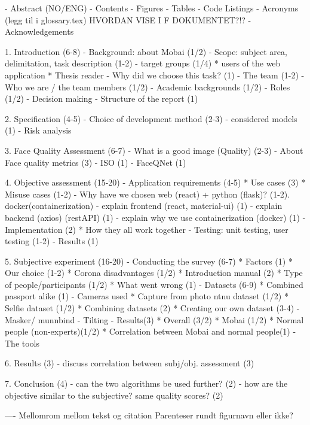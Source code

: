 - Abstract (NO/ENG)
- Contents
- Figures
- Tables
- Code Listings
- Acronyms (legg til i glossary.tex) HVORDAN VISE I F DOKUMENTET?!?
- Acknowledgements

1. Introduction (6-8)
 - Background: about Mobai (1/2)
 - Scope: subject area, delimitation, task description (1-2)
 - target groups (1/4)
    * users of the web application
    * Thesis reader
 - Why did we choose this task? (1)
 - The team (1-2)
   - Who we are / the team members (1/2)
   - Academic backgrounds (1/2)
   - Roles (1/2)
   - Decision making
 - Structure of the report (1)
 
 2. Specification (4-5)
    - Choice of development method (2-3) 
        - considered models (1)
    - Risk analysis
    
    
3. Face Quality Assessment (6-7)
    - What is a good image (Quality) (2-3)
    - About Face quality metrics (3)
        - ISO (1)
        - FaceQNet (1)
  
  
4. Objective assessment (15-20)
    - Application requirements (4-5)
        * Use cases (3)
        * Misuse cases (1-2)
    - Why have we chosen web (react) + python (flask)? (1-2). docker(containerization) 
    - explain frontend (react, material-ui) (1)
    - explain backend (axios) (restAPI) (1)
    - explain why we use containerization (docker) (1)
    - Implementation (2)
        * How they all work together
    - Testing: unit testing, user testing (1-2)
    - Results (1)
    

5. Subjective experiment (16-20)
   - Conducting the survey  (6-7)
        * Factors (1) 
        * Our choice (1-2) 
        * Corona disadvantages (1/2)
        * Introduction manual (2) 
        * Type of people/participants (1/2)
        * What went wrong (1)
    - Datasets (6-9)
        * Combined passport alike (1)
            - Cameras used
        * Capture from photo ntnu dataset (1/2)
        * Selfie dataset (1/2)
        * Combining datasets (2)
        * Creating our own dataset (3-4)
            - Masker/ munnbind 
            - Tilting 
    - Results(3) 
        * Overall (3/2)
        * Mobai (1/2)
        * Normal people (non-experts)(1/2)
        * Correlation between Mobai and normal people(1)
            - The tools
 
6. Results (3)
     - discuss correlation between subj/obj. assessment (3)
  
7. Conclusion (4)
    - can the two algorithms be used further? (2)
    - how are the objective similar to the subjective? same quality scores? (2)
  
 
 
 ----
 Mellomrom mellom tekst og citation
 Parenteser rundt figurnavn eller ikke?